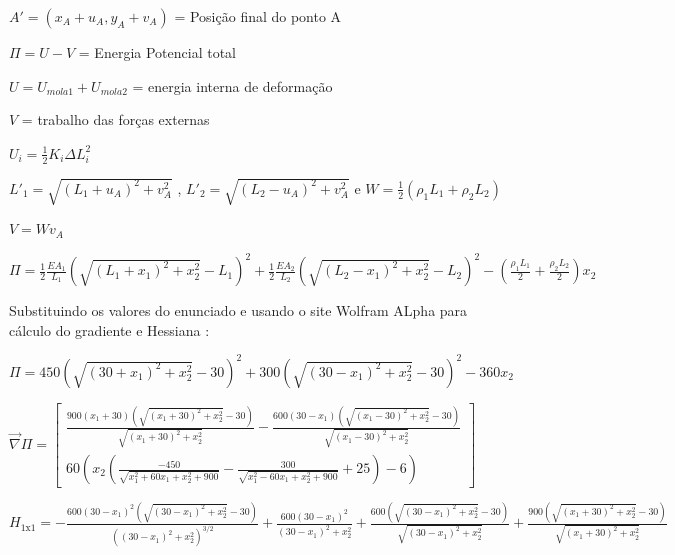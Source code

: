 \documentclass[10pt, a4paper]{article}
\begin{document}
\vspace{3mm}
$A' = (x_A + u_A, y_A + v_A)$ = Posição final do ponto A

\vspace{3mm}
$\Pi = U - V$ = Energia Potencial total

\vspace{3mm}
$U = U_{mola1} + U_{mola2}$ = energia interna de deformação

\vspace{3mm}
$V$ = trabalho das forças externas

\vspace{5mm}
$U_i = \frac{1}{2}K_i\Delta L_i^2$

\vspace{3mm}
$L'_1 = \sqrt{(L_1 + u_A)^2 + v_A^2}$ , $L'_2 = \sqrt{(L_2 - u_A)^2 + v_A^2}$ e $W = \frac{1}{2}(\rho_1L_1 + \rho_2L_2)$

\vspace{3mm}
$V = Wv_A$

\vspace{5mm}
$\Pi = \frac{1}{2}\frac{EA_1}{L_1}(\sqrt{(L_1 + x_1)^2 + x_2^2} - L_1)^2 +
        \frac{1}{2}\frac{EA_2}{L_2}(\sqrt{(L_2 - x_1)^2 + x_2^2} - L_2)^2 - 
        (\frac{\rho_1L_1}{2} + \frac{\rho_2L_2}{2})x_2$

\vspace{3mm}
Substituindo os valores do enunciado e usando o site Wolfram ALpha para cálculo do gradiente e Hessiana :

\vspace{3mm}
$\Pi = 450(\sqrt{(30 + x_1)^2 + x_2^2} - 30)^2 +
        300(\sqrt{(30 - x_1)^2 + x_2^2} - 30)^2 - 
        360x_2$

\vspace{3mm}

 $\overrightarrow{\nabla}\Pi =
\begin{bmatrix}
  \frac{900 (x_1 + 30) (\sqrt{(x_1 + 30)^2 + x_2^2} - 30)}{\sqrt{(x_1 + 30)^2 + x_2^2}} - 
  \frac{600 (30 - x_1) (\sqrt{(x_1 - 30)^2 + x_2^2} - 30)}{\sqrt{(x_1 - 30)^2 + x_2^2}} \\[5mm]
  60 (x_2 (\frac{-450}{\sqrt{x_1^2 + 60 x_1 + x_2^2 + 900}} - \frac{300}{\sqrt{x_1^2 - 60 x_1 + x_2^2 + 900}} + 25) - 6)
\end{bmatrix}$

\vspace{5mm}

$H_{1\text{x}1} = -\frac{600 (30 - x_1)^2 (\sqrt{(30 - x_1)^2 + x_2^2} - 30)}{((30 - x_1)^2 + x_2^2)^{3/2}} +
\frac{600 (30 - x_1)^2}{(30 - x_1)^2 + x_2^2} +
\frac{600 (\sqrt{(30 - x_1)^2 + x_2^2} - 30)}{\sqrt{(30 - x_1)^2 + x_2^2}} +
\frac{900 (\sqrt{(x_1 + 30)^2 + x_2^2} - 30)}{\sqrt{(x_1 + 30)^2 + x_2^2}}$
\end{document}
